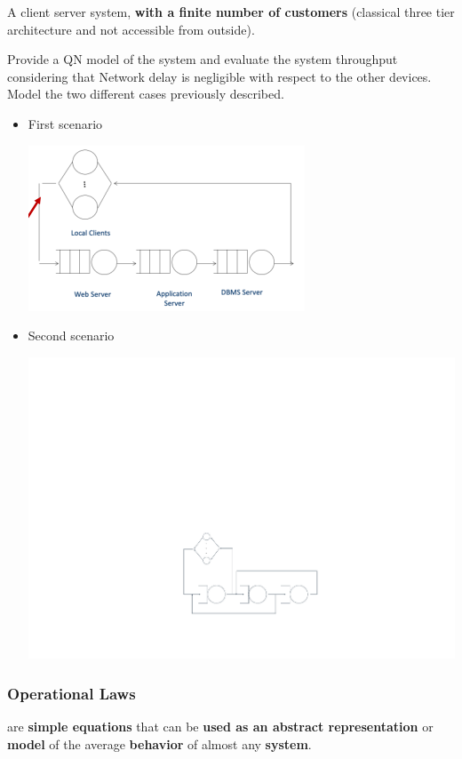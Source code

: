 \begin{examplebox}
	A client server system, \textbf{with a finite number of customers} (classical three tier architecture and not accessible from outside).
	
	Provide a QN model of the system and evaluate the system throughput considering that Network delay is negligible with respect to the other devices. Model the two different cases previously described.
	\begin{itemize}
		\item First scenario
		\begin{center}
			\includegraphics[width=.65\textwidth]{img/queueing-network-10.png}
		\end{center}
		
		\item Second scenario
		\begin{center}
			\includegraphics[width=.6\textwidth]{img/queueing-network-11.pdf}
		\end{center}
	\end{itemize}
\end{examplebox}

\newpage

\subsubsection{Operational Laws}

 are \textbf{simple equations} that can be \textbf{used as an abstract representation} or \textbf{model} of the average \textbf{behavior} of almost any \textbf{system}.

